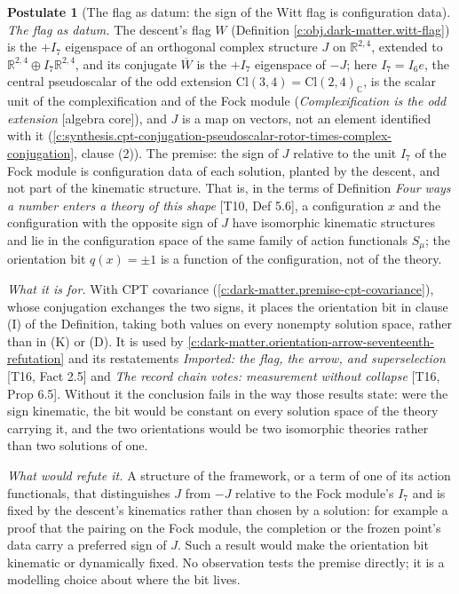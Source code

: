 \documentclass[11pt]{article}
\theoremstyle{definition}
\newtheorem{postulate}[theorem]{Postulate}
\theoremstyle{plain}
\providecommand{\C}{}\renewcommand{\C}{\mathbb{C}}
\providecommand{\Cl}{}\renewcommand{\Cl}{\mathrm{Cl}}
\providecommand{\R}{}\renewcommand{\R}{\mathbb{R}}
\begin{document}
\begin{postulate}[The flag as datum: the sign of the Witt flag is configuration data]\label{c:dark-matter.premise-flag-as-datum}
\emph{The flag as datum.} The descent's flag $W$ (Definition \ref{c:obj.dark-matter.witt-flag}) is the $+I_7$ eigenspace of an orthogonal complex structure $J$ on $\R^{2,4}$, extended to $\R^{2,4} \oplus I_7\R^{2,4}$, and its conjugate $\overline W$ is the $+I_7$ eigenspace of $-J$; here $I_7 = I_6e$, the central pseudoscalar of the odd extension $\Cl(3,4) = \Cl(2,4)_{\C}$, is the scalar unit of the complexification and of the Fock module (\emph{Complexification is the odd extension} [algebra core]), and $J$ is a map on vectors, not an element identified with it (\ref{c:synthesis.cpt-conjugation-pseudoscalar-rotor-times-complex-conjugation}, clause (2)). The premise: the sign of $J$ relative to the unit $I_7$ of the Fock module is configuration data of each solution, planted by the descent, and not part of the kinematic structure. That is, in the terms of Definition \emph{Four ways a number enters a theory of this shape} [T10, Def 5.6], a configuration $x$ and the configuration with the opposite sign of $J$ have isomorphic kinematic structures and lie in the configuration space of the same family of action functionals $S_{\mu}$; the orientation bit $q(x) = \pm 1$ is a function of the configuration, not of the theory.

\emph{What it is for.} With CPT covariance (\ref{c:dark-matter.premise-cpt-covariance}), whose conjugation exchanges the two signs, it places the orientation bit in clause (I) of the Definition, taking both values on every nonempty solution space, rather than in (K) or (D). It is used by \ref{c:dark-matter.orientation-arrow-seventeenth-refutation} and its restatements \emph{Imported: the flag, the arrow, and superselection} [T16, Fact 2.5] and \emph{The record chain votes: measurement without collapse} [T16, Prop 6.5]. Without it the conclusion fails in the way those results state: were the sign kinematic, the bit would be constant on every solution space of the theory carrying it, and the two orientations would be two isomorphic theories rather than two solutions of one.

\emph{What would refute it.} A structure of the framework, or a term of one of its action functionals, that distinguishes $J$ from $-J$ relative to the Fock module's $I_7$ and is fixed by the descent's kinematics rather than chosen by a solution: for example a proof that the pairing on the Fock module, the completion or the frozen point's data carry a preferred sign of $J$. Such a result would make the orientation bit kinematic or dynamically fixed. No observation tests the premise directly; it is a modelling choice about where the bit lives.
\end{postulate}
\end{document}
